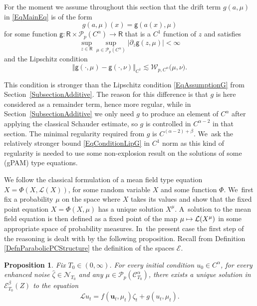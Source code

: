 \documentclass[JEP,XML,SOM,Unicode,published]{cedram}
\newcommand\mto{\mathchoice{\longmapsto}{\mapsto}{\mapsto}{\mapsto}}
\newtheorem{prop}[thm]{Proposition}
\theoremstyle{definition}
\newcommand\bbR{\mathbf{\mathsf{R}}}
\newcommand{\mcE}{\mathcal{E}}
\newcommand{\mcL}{\mathcal{L}}
\newcommand{\mcN}{\mathcal{N}}
\newcommand{\mcP}{\mathcal{P}}
\newcommand\mcW{\mathcal W}
\newcommand{\bsu}{\boldsymbol{u}}
\newcommand{\scrC}{\ensuremath{\mathscr{C}}}
\newcommand{\norme}[1]{\Vert #1 \Vert}
\newcommand{\scrL}{\mathscr{L}}
\begin{document}
For the moment we assume throughout this section that the drift term $g(a,\mu)$ in \eqref{EqMainEq} is of the form
\[
g(a,\mu)(x) = \mathsf{g}(a(x),\mu)
\]
for some function $\mathsf{g} : \bbR\times\mcP_p(C^\alpha)\to\bbR$ that is a $C^1$ function of $z$ and satisfies
\[
\sup_{z\in\bbR}\sup_{\mu\in \mcP_p(C^\alpha)} |\partial_z\mathsf{g}(z,\mu)| < \infty
\]
and the Lipschitz condition
\begin{equation} \label{EqConditionLipG}
\norme{\mathsf{g}(\cdot,\mu) - \mathsf{g}(\cdot,\nu)}_{C^1} \lesssim \mcW_{p,C^\alpha}\bigl(\mu, \nu\bigr).
\end{equation}

This condition is stronger than the Lipschitz condition \eqref{EqAssumptionG} from Section~\ref{SubsectionAdditive}. The reason for this difference is that $g$ is here considered as a remainder term, hence more regular, while in Section~\ref{SubsectionAdditive} we only need $g$ to produce an element of $C^\alpha$ after applying the classical Schauder estimate, so $g$ is controlled in $C^{\alpha-2}$ in that section. The minimal regularity required from $g$ is $C^{(\alpha-2)+\beta}$. We~ask the relatively stronger bound \eqref{EqConditionLipG} in $C^1$ norm as this kind of regularity is needed to use some non-explosion result on the solutions of some (gPAM) type equations.

We follow the classical formulation of a mean field type equation $X=\Phi(X,\mcL(X))$, for some random variable $X$ and some function $\Phi$. We~first fix a probability $\mu$ on the space where $X$ takes its values and show that the fixed point equation $X=\Phi(X,\mu)$ has a unique solution $X^\mu$. A~solution to the mean field equation is then defined as a fixed point of the map $\mu\mto\mcL(X^\mu)$ in some appropriate space of probability measures. In~the present case the first step of the reasoning is dealt with by the following proposition. Recall from Definition \ref{DefnParabolicPCStructure} the definition of the spaces $\mcE$.

\begin{prop} \label{SolPAM1}
Fix $T_0\in(0,\infty)$. For every initial condition $u_0\in C^\alpha$, for every enhanced noise $\widehat \zeta\in{{\boldsymbol{\mcN}}_{T_0}}$ and any $\mu\in \mcP_{p}(\scrC^\alpha_{T_0})$, there exists a unique solution in $\mcE^\beta_{T_0}(Z)$ to the equation
\begin{equation} \label{EqEquationMuFixed}
\scrL u_t = f(\bsu_t,\mu_t)\zeta_t + g(u_t,\mu_t).
\end{equation}
\end{prop}
\end{document}
